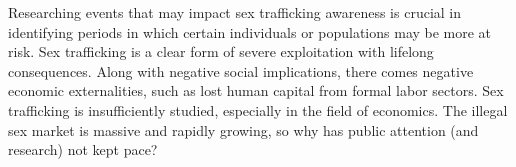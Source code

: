 \documentclass[10pt]{article}
\begin{document}
\indent Researching events that may impact sex trafficking awareness is crucial in identifying periods in which certain individuals or populations may be more at risk. Sex trafficking is a clear form of severe exploitation with lifelong consequences. Along with negative social implications, there comes negative economic externalities, such as lost human capital from formal labor sectors. Sex trafficking is insufficiently studied, especially in the field of economics. The illegal sex market is massive and rapidly growing, so why has public attention (and research) not kept pace? 
\end{document}
